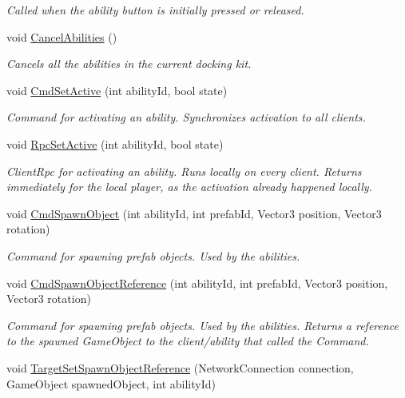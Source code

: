 \begin{DoxyCompactItemize}
\begin{DoxyCompactList}\small\item\em Called when the ability button is initially pressed or released. \end{DoxyCompactList}\item 
void \hyperlink{class_docking_a8732fdddd1a146c1de3491d3981e68b6}{Cancel\+Abilities} ()
\begin{DoxyCompactList}\small\item\em Cancels all the abilities in the current docking kit. \end{DoxyCompactList}\item 
void \hyperlink{class_docking_af1a41524e65fb8d56334e76090d3a23e}{Cmd\+Set\+Active} (int ability\+Id, bool state)
\begin{DoxyCompactList}\small\item\em Command for activating an ability. Synchronizes activation to all clients. \end{DoxyCompactList}\item 
void \hyperlink{class_docking_af9eb2fc63cb3035d9931fe5ec9f244aa}{Rpc\+Set\+Active} (int ability\+Id, bool state)
\begin{DoxyCompactList}\small\item\em Client\+Rpc for activating an ability. Runs locally on every client. Returns immediately for the local player, as the activation already happened locally. \end{DoxyCompactList}\item 
void \hyperlink{class_docking_a1ba4c6b41e3155890c4f3996214fdf7d}{Cmd\+Spawn\+Object} (int ability\+Id, int prefab\+Id, Vector3 position, Vector3 rotation)
\begin{DoxyCompactList}\small\item\em Command for spawning prefab objects. Used by the abilities. \end{DoxyCompactList}\item 
void \hyperlink{class_docking_a68278f152756e9f77c3523455fa65cee}{Cmd\+Spawn\+Object\+Reference} (int ability\+Id, int prefab\+Id, Vector3 position, Vector3 rotation)
\begin{DoxyCompactList}\small\item\em Command for spawning prefab objects. Used by the abilities. Returns a reference to the spawned Game\+Object to the client/ability that called the Command. \end{DoxyCompactList}\item 
void \hyperlink{class_docking_a7880a7127467ba0912691f1995899177}{Target\+Set\+Spawn\+Object\+Reference} (Network\+Connection connection, Game\+Object spawned\+Object, int ability\+Id)

\end{DoxyCompactItemize}
